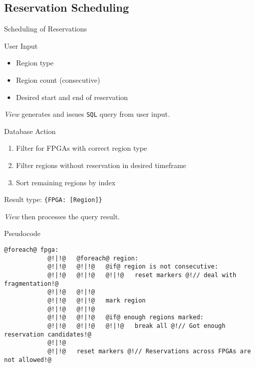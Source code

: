 \documentclass{beamer}
\begin{document}
\subsection{Reservation Scheduling}
    
    \begin{frame}{Scheduling of Reservations}
        \begin{block}{User Input}
            \begin{itemize}
                \item Region type
                \item Region count (consecutive)
                \item Desired start and end of reservation
            \end{itemize}
        \end{block}

    \framebreak
        
        \emph{View} generates and issues \texttt{SQL} query from user input.
        
        \begin{block}{Database Action}
            \begin{enumerate}
                \item Filter for FPGAs with correct region type
                \item Filter regions without reservation in desired timeframe
                \item Sort remaining regions by index 
            \end{enumerate}
        \end{block}
        
        Result type: \texttt{\{FPGA: [Region]\}}

    \framebreak
        \emph{View} then processes the query result.
    
        \begin{block}{Pseudocode}
         
        \begin{lstlisting}[style=http]
            @foreach@ fpga:
            @!|!@   @foreach@ region:
            @!|!@   @!|!@   @if@ region is not consecutive:
            @!|!@   @!|!@   @!|!@   reset markers @!// deal with fragmentation!@
            @!|!@   @!|!@
            @!|!@   @!|!@   mark region
            @!|!@   @!|!@   
            @!|!@   @!|!@   @if@ enough regions marked:
            @!|!@   @!|!@   @!|!@   break all @!// Got enough reservation candidates!@
            @!|!@
            @!|!@   reset markers @!// Reservations across FPGAs are not allowed!@


\end{lstlisting}
\end{block}
\end{frame}
\end{document}
